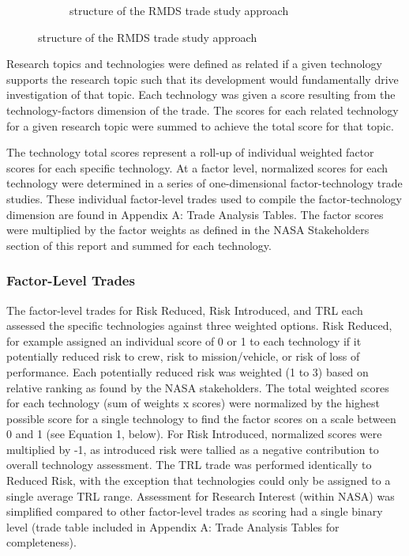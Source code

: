 \begin{figure}[tb!]
\begin{center}
\begin{subfigure}{0.49\textwidth}
            \caption{structure of the RMDS trade study approach}
        \end{subfigure}
    \end{center}
\end{figure}

Research topics and technologies were defined as related if a given technology supports the research topic such that its development would fundamentally drive investigation of that topic. Each technology was given a score resulting from the technology-factors dimension of the trade. The scores for each related technology for a given research topic were summed to achieve the total score for that topic.

The technology total scores represent a roll-up of individual weighted factor scores for each specific technology. At a factor level, normalized scores for each technology were determined in a series of one-dimensional factor-technology trade studies. These individual factor-level trades used to compile the factor-technology dimension are found in Appendix A: Trade Analysis Tables. The factor scores were multiplied by the factor weights as defined in the NASA Stakeholders section of this report and summed for each technology.

\subsubsection{Factor-Level Trades}
The factor-level trades for Risk Reduced, Risk Introduced, and TRL each assessed the specific technologies against three weighted options. Risk Reduced, for example assigned an individual score of 0 or 1 to each technology if it potentially reduced risk to crew, risk to mission/vehicle, or risk of loss of performance. Each potentially reduced risk was weighted (1 to 3) based on relative ranking as found by the NASA stakeholders. The total weighted scores for each technology (sum of weights x scores) were normalized by the highest possible score for a single technology to find the factor scores on a scale between 0 and 1 (see Equation 1, below).
For Risk Introduced, normalized scores were multiplied by -1, as introduced risk were tallied as a negative contribution to overall technology assessment. The TRL trade was performed identically to Reduced Risk, with the exception that technologies could only be assigned to a single average TRL range. Assessment for Research Interest (within NASA) was simplified compared to other factor-level trades as scoring had a single binary level (trade table included in Appendix A: Trade Analysis Tables for completeness).

